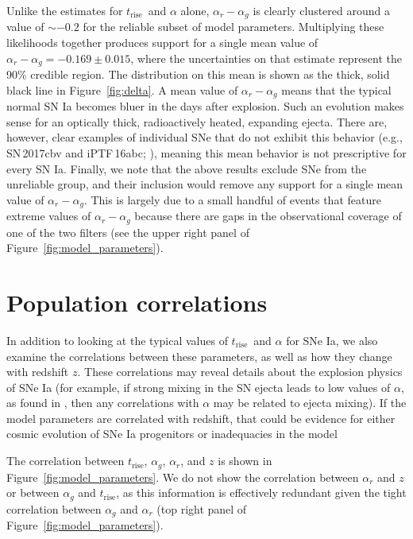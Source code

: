 \documentclass[twocolumn]{./aastex63}
\newcommand{\trise}{$t_\mathrm{rise}$}
\begin{document}
Unlike the estimates for \trise\ and $\alpha$ alone, $\alpha_r - \alpha_g$ is
clearly clustered around a value of $\sim{-0.2}$ for the reliable subset of
model parameters. Multiplying these likelihoods together produces support for a
single mean value of $\alpha_r - \alpha_g = -0.169 \pm 0.015$, where the
uncertainties on that estimate represent the 90\% credible region. The
distribution on this mean is shown as the thick, solid black line in
Figure~\ref{fig:delta}. A mean value of $\alpha_r - \alpha_g$ means that the
typical normal SN Ia becomes bluer in the days after explosion. Such an
evolution makes sense for an optically thick, radioactively heated, expanding
ejecta. There are, however, clear examples of individual SNe that do not exhibit
this behavior (e.g., SN\,2017cbv and iPTF\,16abc;
\citealt{Hosseinzadeh17,Miller18}), meaning this mean behavior is not
prescriptive for every SN Ia. Finally, we note that the above results exclude
SNe from the unreliable group, and their inclusion would remove any support for
a single mean value of $\alpha_r - \alpha_g$. This is largely due to a small
handful of events that feature extreme values of $\alpha_r - \alpha_g$ because
there are gaps in the observational coverage of one of the two filters (see the
upper right panel of Figure~\ref{fig:model_parameters}).

\section{Population correlations}

In addition to looking at the typical values of \trise\ and $\alpha$ for SNe Ia,
we also examine the correlations between these parameters, as well as how they
change with redshift $z$. These correlations may reveal details about the
explosion physics of SNe Ia (for example, if strong mixing in the SN ejecta
leads to low values of $\alpha$, as found in \citealt{Piro16}, then any
correlations with $\alpha$ may be related to ejecta mixing). If the model
parameters are correlated with redshift, that could be evidence for either
cosmic evolution of SNe Ia progenitors or inadequacies in the model

The correlation between $t_\mathrm{rise}$, $\alpha_g$, $\alpha_r$, and $z$ is
shown in Figure~\ref{fig:model_parameters}. We do not show the correlation
between $\alpha_r$ and $z$ or between $\alpha_g$ and \trise, as this
information is effectively redundant given the tight correlation between
$\alpha_g$ and $\alpha_r$ (top right panel of
Figure~\ref{fig:model_parameters}).
\end{document}
